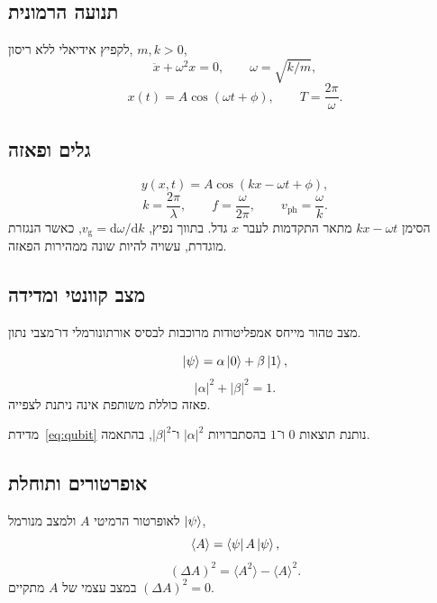 \begin{referencecolumns}
\begin{referenceentry}
\section{תנועה הרמונית}
לקפיץ אידיאלי ללא ריסון, $m,k>0$,
\[
\ddot x+\omega^2x=0,\qquad \omega=\sqrt{k/m},
\]
\[
x(t)=A\cos(\omega t+\phi),\qquad T=\frac{2\pi}{\omega}.
\]
\begin{referenceqa}
\end{referenceqa}
\end{referenceentry}

\begin{referenceentry}
\section{גלים ופאזה}
\[
y(x,t)=A\cos(kx-\omega t+\phi),
\]
\[
k=\frac{2\pi}{\lambda},\qquad f=\frac{\omega}{2\pi},\qquad
v_{\mathrm{ph}}=\frac{\omega}{k}.
\]
הסימן $kx-\omega t$ מתאר התקדמות לעבר $x$ גדל.
בתווך נפיץ, $v_{\mathrm g}=\mathrm d\omega/\mathrm dk$, כאשר הנגזרת מוגדרת,
עשויה להיות שונה ממהירות הפאזה.
\end{referenceentry}

\begin{referenceentry}
\section{מצב קוונטי ומדידה}
מצב טהור מייחס אמפליטודות מרוכבות לבסיס אורתונורמלי דו־מצבי נתון.
\begin{referenceformula}
\begin{equation}\label{eq:qubit}
\left|\psi\right\rangle=\alpha\left|0\right\rangle+\beta\left|1\right\rangle,
\end{equation}
\[
|\alpha|^2+|\beta|^2=1.
\]
פאזה כוללת משותפת אינה ניתנת לצפייה.
\end{referenceformula}
מדידת~\eqref{eq:qubit} נותנת תוצאות $0$ ו־$1$ בהסתברויות
$|\alpha|^2$ ו־$|\beta|^2$, בהתאמה.
\subsection{אופרטורים ותוחלת}
לאופרטור הרמיטי $A$ ולמצב מנורמל $\left|\psi\right\rangle$,
\[
\langle A\rangle=\left\langle\psi\right| A\left|\psi\right\rangle,
\]
\[
(\Delta A)^2=\langle A^2\rangle-\langle A\rangle^2.
\]
במצב עצמי של $A$ מתקיים $(\Delta A)^2=0$.
\end{referenceentry}


\end{referencecolumns}
